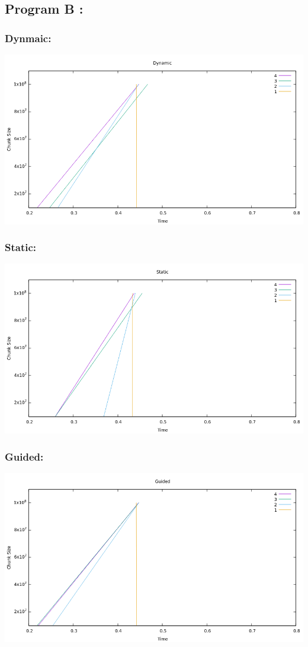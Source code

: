\documentclass[a4paper,10pt]{article}
\begin{document}
\subsection{Program B :}
\subsubsection{Dynmaic:}
\includegraphics[scale=0.65]{bDyn}\\
\subsubsection{Static:}
\includegraphics[scale=0.65]{BSTpnd}\\
\subsubsection{Guided:}
\includegraphics[scale=0.65]{bGT}\\
\end{document}
